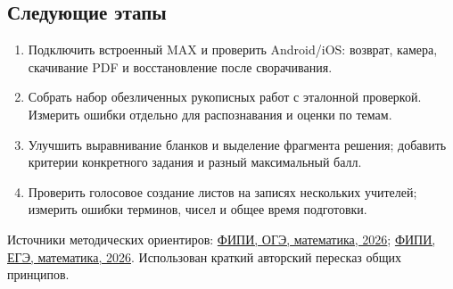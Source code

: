 \documentclass[a4paper,11pt]{article}
\begin{document}
\subsection{Следующие этапы}
\begin{enumerate}
\item Подключить встроенный MAX и проверить Android/iOS: возврат, камера,
скачивание PDF и восстановление после сворачивания.
\item Собрать набор обезличенных рукописных работ с эталонной проверкой.
Измерить ошибки отдельно для распознавания и оценки по темам.
\item Улучшить выравнивание бланков и выделение фрагмента решения; добавить
критерии конкретного задания и разный максимальный балл.
\item Проверить голосовое создание листов на записях нескольких учителей;
измерить ошибки терминов, чисел и общее время подготовки.
\end{enumerate}
\small
Источники методических ориентиров:
\href{https://doc.fipi.ru/oge/dlya-predmetnyh-komissiy-subektov-rf/2026/mr_oge_matematika_2026.pdf}{ФИПИ, ОГЭ, математика, 2026};
\href{https://doc.fipi.ru/ege/dlya-predmetnyh-komissiy-subektov-rf/2026/matematika_mr_ege_2026.pdf}{ФИПИ, ЕГЭ, математика, 2026}.
Использован краткий авторский пересказ общих принципов.
\end{document}
